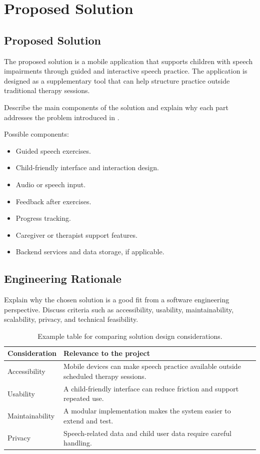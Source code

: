 \chapter{Proposed Solution}
\label{ch:proposed-solution}

\section{Proposed Solution}
\label{sec:proposed-solution}

The proposed solution is a mobile application that supports children with speech impairments through guided and interactive speech practice. The application is designed as a supplementary tool that can help structure practice outside traditional therapy sessions.

Describe the main components of the solution and explain why each part addresses the problem introduced in .

Possible components:
\begin{itemize}[noitemsep]
  \item Guided speech exercises.
  \item Child-friendly interface and interaction design.
  \item Audio or speech input.
  \item Feedback after exercises.
  \item Progress tracking.
  \item Caregiver or therapist support features.
  \item Backend services and data storage, if applicable.
\end{itemize}

\section{Engineering Rationale}
\label{sec:engineering-rationale}

Explain why the chosen solution is a good fit from a software engineering perspective. Discuss criteria such as accessibility, usability, maintainability, scalability, privacy, and technical feasibility.

\begin{table}[H]
  \centering
  \caption{Example table for comparing solution design considerations.}
  \label{tab:solution-considerations}
  \begin{tabular}{p{} p{}}
    \toprule
    \textbf{Consideration} & \textbf{Relevance to the project} \\
    \midrule
    Accessibility & Mobile devices can make speech practice available outside scheduled therapy sessions. \\
    Usability & A child-friendly interface can reduce friction and support repeated use. \\
    Maintainability & A modular implementation makes the system easier to extend and test. \\
    Privacy & Speech-related data and child user data require careful handling. \\
    \bottomrule
  \end{tabular}
\end{table}
